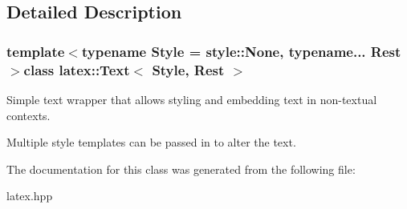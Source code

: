 \subsection{Detailed Description}
\subsubsection*{template$<$typename Style = style\-::\-None, typename... Rest$>$class latex\-::\-Text$<$ Style, Rest $>$}

Simple text wrapper that allows styling and embedding text in non-\/textual contexts.

Multiple style templates can be passed in to alter the text. 

The documentation for this class was generated from the following file\-:\begin{DoxyCompactItemize}
\item 
latex.\-hpp\end{DoxyCompactItemize}
